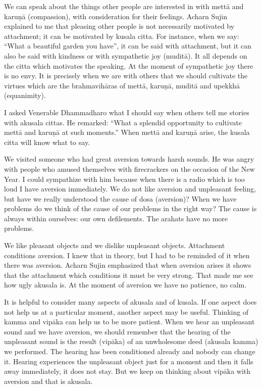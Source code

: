 We can speak about the things other people are interested in with mettā
and karuṇā (compassion), with consideration for their feelings. Acharn
Sujin explained to me that pleasing other people is not necessarily
motivated by attachment; it can be motivated by kusala citta. For
instance, when we say: ``What a beautiful garden you have'', it can be
said with attachment, but it can also be said with kindness or with
sympathetic joy (muditā). It all depends on the citta which motivates
the speaking. At the moment of sympathetic joy there is no envy. It is
precisely when we are with others that we should cultivate the virtues
which are the brahmavihāras of mettā, karuṇā, muditā and upekkhā
(equanimity).

I asked Venerable Dhammadharo what I should say when others tell me
stories with akusala cittas. He remarked: ``What a splendid opportunity
to cultivate mettā and karuṇā at such moments.'' When mettā and karuṇā
arise, the kusala citta will know what to say.

We visited someone who had great aversion towards harsh sounds. He was
angry with people who amused themselves with firecrackers on the
occasion of the New Year. I could sympathize with him because when there
is a radio which is too loud I have aversion immediately. We do not like
aversion and unpleasant feeling, but have we really understood the cause
of dosa (aversion)? When we have problems do we think of the cause of
our problems in the right way? The cause is always within ourselves: our
own defilements. The arahats have no more problems.

We like pleasant objects and we dislike unpleasant objects. Attachment
conditions aversion. I knew that in theory, but I had to be reminded of
it when there was aversion. Acharn Sujin emphasized that when aversion
arises it shows that the attachment which conditions it must be very
strong. That made me see how ugly akusala is. At the moment of aversion
we have no patience, no calm.

It is helpful to consider many aspects of akusala and of kusala. If one
aspect does not help us at a particular moment, another aspect may be
useful. Thinking of kamma and vipāka can help us to be more patient.
When we hear an unpleasant sound and we have aversion, we should
remember that the hearing of the unpleasant sound is the result (vipāka)
of an unwholesome deed (akusala kamma) we performed. The hearing has
been conditioned already and nobody can change it. Hearing experiences
the unpleasant object just for a moment and then it falls away
immediately, it does not stay. But we keep on thinking about vipāka with
aversion and that is akusala.

